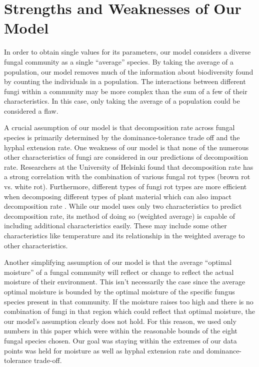 \documentclass[12pt]{article}
\begin{document}
\section{Strengths and Weaknesses of Our Model}

In order to obtain single values for its parameters, our model considers a diverse fungal community as a single ``average'' species. By taking the average of a population, our model removes much of the information about biodiversity found by counting the individuals in a population. The interactions between different fungi within a community may be more complex than the sum of a few of their characteristics. In this case, only taking the average of a population could be considered a flaw. 

A crucial assumption of our model is that decomposition rate across fungal species is primarily determined by the dominance-tolerance trade off and the hyphal extension rate. One weakness of our model is that none of the numerous other characteristics of fungi are considered in our predictions of decomposition rate. Researchers at the University of Helsinki found that decomposition rate has a strong correlation with the combination of various fungal rot types (brown rot vs. white rot). Furthermore, different types of fungi rot types are more efficient when decomposing different types of plant material which can also impact decomposition rate \cite{newsRX}. While our model uses only two characteristics to predict decomposition rate, its method of doing so (weighted average) is capable of including additional characteristics easily. These may include some other characteristics like temperature and its relationship in the weighted average to other characteristics.

Another simplifying assumption of our model is that the average ``optimal moisture'' of a fungal community will reflect or change to reflect the actual moisture of their environment. This isn't necessarily the case since the average optimal moisture is bounded by the optimal moisture of the specific fungus species present in that community. If the moisture raises too high and there is no combination of fungi in that region which could reflect that optimal moisture, the our model's assumption clearly does not hold. For this reason, we used only numbers in this paper which were within the reasonable bounds of the eight fungal species chosen. Our goal was staying within the extremes of our data points was held for moisture as well as hyphal extension rate and dominance-tolerance trade-off. 
\end{document}

